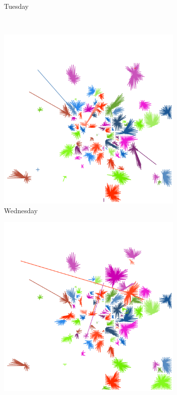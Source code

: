 \documentclass[12pt,a4paper]{article}
\begin{document}
\begin{figure}[H]
\begin{subfigure}[b]{0.48\textwidth}
\caption{Tuesday}
\end{subfigure}
\\
\begin{subfigure}[b]{0.48\textwidth}
\includegraphics[width=\textwidth]{weekDef/edges-3Wed-small.png}
\caption{Wednesday}
\end{subfigure}
\begin{subfigure}[b]{0.48\textwidth}
\includegraphics[width=\textwidth]{weekDef/edges-4Thu-small.png}

\end{subfigure}
\end{figure}
\end{document}
